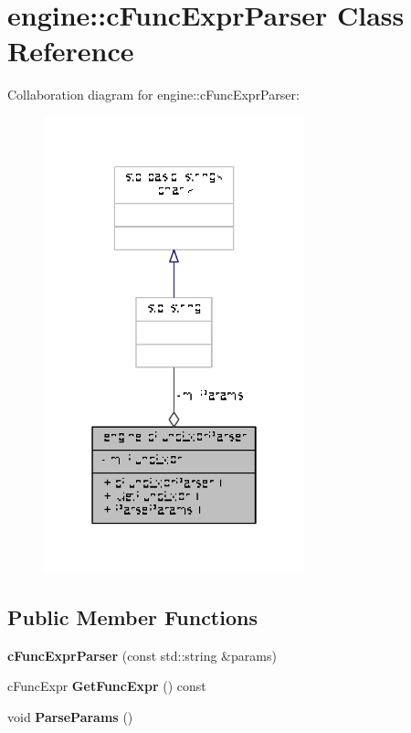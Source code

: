 \hypertarget{classengine_1_1cFuncExprParser}{\section{engine\-:\-:c\-Func\-Expr\-Parser Class Reference}
\label{classengine_1_1cFuncExprParser}
}


Collaboration diagram for engine\-:\-:c\-Func\-Expr\-Parser\-:
\nopagebreak
\begin{figure}[H]
\begin{center}
\leavevmode
\includegraphics[width=214pt]{classengine_1_1cFuncExprParser__coll__graph}
\end{center}
\end{figure}
\subsection*{Public Member Functions}
\begin{DoxyCompactItemize}
\item 
\hypertarget{classengine_1_1cFuncExprParser_a40968ec3a44c2eb83c12d6f0fae97542}{{\bfseries c\-Func\-Expr\-Parser} (const std\-::string \&params)}\label{classengine_1_1cFuncExprParser_a40968ec3a44c2eb83c12d6f0fae97542}

\item 
\hypertarget{classengine_1_1cFuncExprParser_a1d8590ea65a3583e11093ffc690db91a}{c\-Func\-Expr {\bfseries Get\-Func\-Expr} () const }\label{classengine_1_1cFuncExprParser_a1d8590ea65a3583e11093ffc690db91a}

\item 
\hypertarget{classengine_1_1cFuncExprParser_afe428012b8d9886acfd325ce3b910f03}{void {\bfseries Parse\-Params} ()}\label{classengine_1_1cFuncExprParser_afe428012b8d9886acfd325ce3b910f03}

\end{DoxyCompactItemize}
